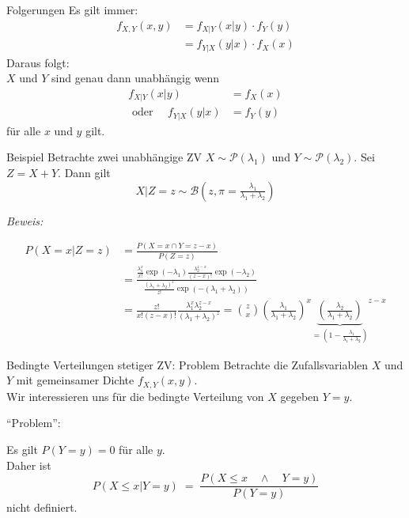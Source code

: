 \documentclass[
  10pt,
  ignorenonframetext,
]{beamer}
\begin{document}
\begin{frame}{Folgerungen}
\protect\hypertarget{folgerungen-4}{}
Es gilt immer: \begin{align*}
f_{X,Y}(x,y) & =  f_{X|Y}(x|y) \cdot f_Y(y)\\
& =  f_{Y|X}(y|x) \cdot f_X(x)
\end{align*} Daraus folgt:\\
\(X\) und \(Y\) sind genau dann unabhängig wenn \begin{align*}
f_{X|Y}(x|y) & =  f_X(x) \\
\mbox{ oder }\quad
f_{Y|X}(y|x) & =  f_Y(y)
\end{align*} für alle \(x\) und \(y\) gilt.
\end{frame}

\begin{frame}{Beispiel}
\protect\hypertarget{beispiel-1}{}
Betrachte zwei unabhängige ZV \(X\sim\mathcal P(\lambda_1)\) und
\(Y \sim \mathcal P(\lambda_2)\). Sei \(Z=X+Y\). Dann gilt \[
X|Z = z \sim {\mathcal B}\left(z, \pi=\tfrac{\lambda_1}{\lambda_1+\lambda_2}\right) 
\]

\emph{Beweis:}

\begin{align*}
P(X=x|Z=z) &= \frac{P(X=x \cap Y = z-x)}{P(Z=z)} \\
&= \frac{ \frac{\lambda_1^x}{x!}\exp(-\lambda_1)  \frac{\lambda_2^{z-x}}{(z-x)!}\exp(-\lambda_2)}{  \frac{(\lambda_1+\lambda_2)^z}{z!}\exp(-(\lambda_1+\lambda_2)) } \\
&= \frac{z!}{x!(z-x)!}  \frac{\lambda_1^x \lambda_2^{z-x}}{(\lambda_1 + \lambda_2)^{z}} = \binom{z}{x} \left(\frac{\lambda_1}{\lambda_1+\lambda_2}\right)^x
{\underbrace{\left(\frac{\lambda_2}{\lambda_1+\lambda_2}\right)}_{= \left(1-\tfrac{\lambda_1}{\lambda_1+\lambda_2}\right)}}^{z-x}
\end{align*}
\end{frame}

\begin{frame}{Bedingte Verteilungen stetiger ZV: Problem}
\protect\hypertarget{bedingte-verteilungen-stetiger-zv-problem}{}
Betrachte die Zufallsvariablen \(X\) und \(Y\) mit gemeinsamer Dichte
\(f_{X,Y}(x,y)\).\\
Wir interessieren uns für die bedingte Verteilung von \(X\) gegeben
\(Y = y\).

``Problem'':

Es gilt \(P(Y = y) = 0\) für alle \(y\).\\
Daher ist \[
P(X \leq x | Y = y) \; = \; \frac{P(X \leq x \quad \land
\quad Y = y)}{P(Y = y)}
\] nicht definiert.
\end{frame}
\end{document}
